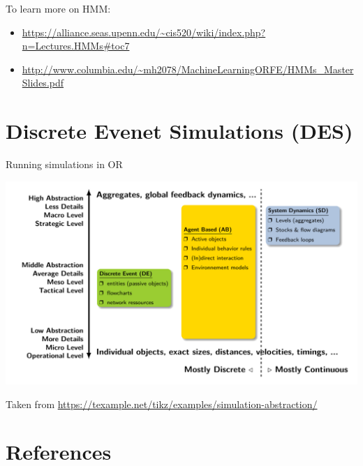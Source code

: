 \documentclass[c]{beamer}
\begin{document}
\begin{frame}
To learn more on HMM:
\begin{itemize}
  \item \url{https://alliance.seas.upenn.edu/~cis520/wiki/index.php?n=Lectures.HMMs#toc7}
  \item \url{http://www.columbia.edu/~mh2078/MachineLearningORFE/HMMs_MasterSlides.pdf}
\end{itemize}
\begin{frame}

\section{Discrete Evenet Simulations (DES)}
\begin{frame}{Running simulations in OR}
  \begin{center}
    \includegraphics[width=0.7\linewidth]{../figures/simulation.pdf}
  \end{center}
  Taken from \url{https://texample.net/tikz/examples/simulation-abstraction/}
\end{frame}

\section{References}


\end{frame}
\end{frame}
\end{document}

